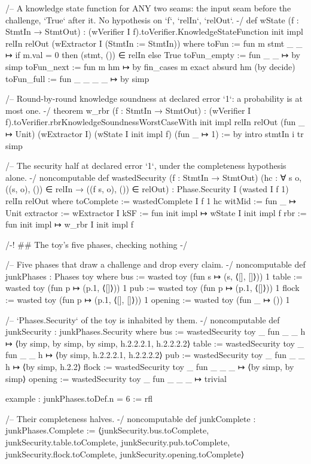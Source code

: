 \begin{leancode}
/-- A knowledge state function for ANY two seams: the input seam before the challenge, `True`
after it. No hypothesis on `f`, `relIn`, `relOut`. -/
def wState (f : StmtIn → StmtOut) :
    (wVerifier I f).toVerifier.KnowledgeStateFunction init impl relIn relOut
      (wExtractor I (StmtIn := StmtIn)) where
  toFun := fun m stmt _ _ ↦ if m.val = 0 then (stmt, ()) ∈ relIn else True
  toFun_empty := fun _ _ ↦ by simp
  toFun_next := fun m hm ↦ by
    fin_cases m
    exact absurd hm (by decide)
  toFun_full := fun _ _ _ _ ↦ by simp

/-- Round-by-round knowledge soundness at declared error `1`: a probability is at most one. -/
theorem w_rbr (f : StmtIn → StmtOut) :
    (wVerifier I f).toVerifier.rbrKnowledgeSoundnessWorstCaseWith init impl relIn relOut
      (fun _ ↦ Unit) (wExtractor I) (wState I init impl f) (fun _ ↦ 1) := by
  intro stmtIn i tr
  simp

/-- The security half at declared error `1`, under the completeness hypothesis alone. -/
noncomputable def wastedSecurity (f : StmtIn → StmtOut)
    (hc : ∀ s o, ((s, o), ()) ∈ relIn → ((f s, o), ()) ∈ relOut) :
    Phase.Security I (wasted I f 1) relIn relOut where
  toComplete := wastedComplete I f 1 hc
  witMid := fun _ ↦ Unit
  extractor := wExtractor I
  kSF := fun init impl ↦ wState I init impl f
  rbr := fun init impl ↦ w_rbr I init impl f

/-! ## The toy's five phases, checking nothing -/

/-- Five phases that draw a challenge and drop every claim. -/
noncomputable def junkPhases : Phases toy where
  bus := wasted toy (fun s ↦ (s, ⟨[], []⟩)) 1
  table := wasted toy (fun p ↦ (p.1, ⟨[]⟩)) 1
  pub := wasted toy (fun p ↦ (p.1, ⟨[]⟩)) 1
  flock := wasted toy (fun p ↦ (p.1, ⟨[], []⟩)) 1
  opening := wasted toy (fun _ ↦ ()) 1

/-- `Phases.Security` of the toy is inhabited by them. -/
noncomputable def junkSecurity : junkPhases.Security where
  bus := wastedSecurity toy _ fun _ _ h ↦ ⟨by simp, by simp, by simp, h.2.2.2.1, h.2.2.2.2⟩
  table := wastedSecurity toy _ fun _ _ h ↦ ⟨by simp, h.2.2.2.1, h.2.2.2.2⟩
  pub := wastedSecurity toy _ fun _ _ h ↦ ⟨by simp, h.2.2⟩
  flock := wastedSecurity toy _ fun _ _ _ ↦ ⟨by simp, by simp⟩
  opening := wastedSecurity toy _ fun _ _ _ ↦ trivial

example : junkPhases.toDef.n = 6 := rfl

/-- Their completeness halves. -/
noncomputable def junkComplete : junkPhases.Complete :=
  ⟨junkSecurity.bus.toComplete, junkSecurity.table.toComplete, junkSecurity.pub.toComplete,
    junkSecurity.flock.toComplete, junkSecurity.opening.toComplete⟩


\end{leancode}
